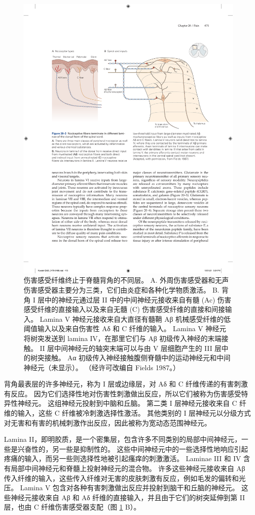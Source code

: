 \begin{figure}[htbp]
	\centering
	\includegraphics[width=0.7\linewidth]{chap20/fig_20_3}
	\caption{伤害感受纤维终止于脊髓背角的不同层。 
		A. 外周伤害感受器和无声伤害感受器主要分为三类，它们由炎症和各种化学物质激活。 
		B. 背角 I 层中的神经元通过层 II 中的中间神经元接收来自有髓 (Ac) 伤害感受纤维的直接输入以及来自无髓 (C) 伤害感受纤维的直接和间接输入。 
		Lamina V 神经元接收来自大直径有髓鞘 Aβ 机械感受纤维的低阈值输入以及来自伤害性 Aδ 和 C 纤维的输入。 
		Lamina V 神经元将树突发送到 lamina IV，在那里它们与 Aβ 初级传入神经的末端接触。 
		II 层中间神经元的轴突末端可以与由 V 层细胞产生的 III 层中的树突接触。
		Aα 初级传入神经接触腹侧脊髓中的运动神经元和中间神经元（未显示）。 （经许可改编自 Fields 1987。）}
	\label{fig:20_3}
\end{figure}


背角最表层的许多神经元，称为 I 层或边缘层，对 Aδ 和 C 纤维传递的有害刺激有反应。 
因为它们选择性地对伤害性刺激做出反应，所以它们被称为伤害感受特异性神经元。 
这组神经元投射到中脑和丘脑。 
第二类 I 层神经元接收来自 C 纤维的输入，这些 C 纤维被冷刺激选择性激活。 
其他类别的 I 层神经元以分级方式对无害和有害的机械刺激作出反应，因此被称为宽动态范围神经元。


Lamina II，即明胶质，是一个密集层，包含许多不同类别的局部中间神经元，一些是兴奋性的，另一些是抑制性的。 
这些中间神经元中的一些选择性地响应引起疼痛的输入，而另一些则选择性地被引起瘙痒的刺激激活。 
Laminae III 和 IV 含有局部中间神经元和脊髓上投射神经元的混合物。 
许多这些神经元接收来自 Aβ 传入纤维的输入，这些传入纤维对无害的皮肤刺激有反应，例如毛发的偏转和光压。 
Lamina V 包含对各种有害刺激做出反应并投射到脑干和丘脑的神经元。 
这些神经元接收来自 Aβ 和 Aδ 纤维的直接输入，并且由于它们的树突延伸到第 II 层，也由 C 纤维伤害感受器支配（图 \ref{fig:20_3} B）。


